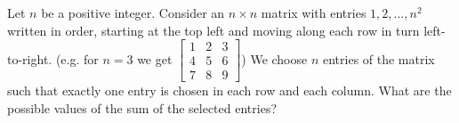 Let $ n$ be a positive integer. Consider an $ n\times n$ matrix with entries $ 1,2,...,n^2$ written in order, starting at the top left and moving along each row in turn left-to-right. (e.g. for $ n = 3$ we get $ \left[\begin{array}{ccc}1 & 2 & 3 \\
4 & 5 & 6 \\
7 & 8 & 9\end{array}\right]$)
We choose $ n$ entries of the matrix such that exactly one entry is chosen in each row and each column. What are the possible values of the sum of the selected entries?